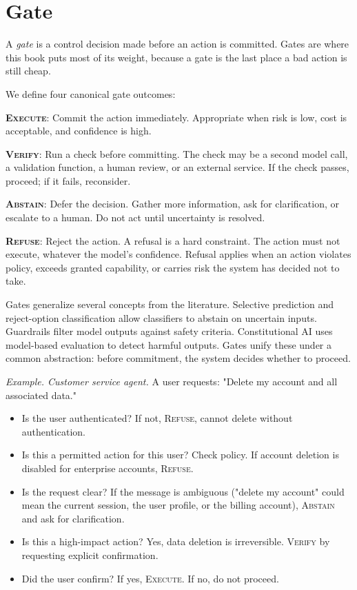 \section{Gate}

A \emph{gate} is a control decision made before an action is committed. Gates are where this book puts most of its weight, because a gate is the last place a bad action is still cheap.

We define four canonical gate outcomes:

\textbf{\textsc{Execute}}: Commit the action immediately. Appropriate when risk is low, cost is acceptable, and confidence is high.

\textbf{\textsc{Verify}}: Run a check before committing. The check may be a second model call, a validation function, a human review, or an external service. If the check passes, proceed; if it fails, reconsider.

\textbf{\textsc{Abstain}}: Defer the decision. Gather more information, ask for clarification, or escalate to a human. Do not act until uncertainty is resolved.

\textbf{\textsc{Refuse}}: Reject the action. A refusal is a hard constraint. The action must not execute, whatever the model's confidence. Refusal applies when an action violates policy, exceeds granted capability, or carries risk the system has decided not to take.

Gates generalize several concepts from the literature. Selective prediction \cite{geifman2017selective} and reject-option classification \cite{chow1970optimum} allow classifiers to abstain on uncertain inputs. Guardrails \cite{rebedea2023nemo} filter model outputs against safety criteria. Constitutional AI \cite{bai2022constitutional} uses model-based evaluation to detect harmful outputs. Gates unify these under a common abstraction: before commitment, the system decides whether to proceed.

\textit{Example. Customer service agent.} A user requests: "Delete my account and all associated data."

\begin{itemize}
\item Is the user authenticated? If not, \textsc{Refuse}, cannot delete without authentication.
\item Is this a permitted action for this user? Check policy. If account deletion is disabled for enterprise accounts, \textsc{Refuse}.
\item Is the request clear? If the message is ambiguous ("delete my account" could mean the current session, the user profile, or the billing account), \textsc{Abstain} and ask for clarification.
\item Is this a high-impact action? Yes, data deletion is irreversible. \textsc{Verify} by requesting explicit confirmation.
\item Did the user confirm? If yes, \textsc{Execute}. If no, do not proceed.
\end{itemize}

